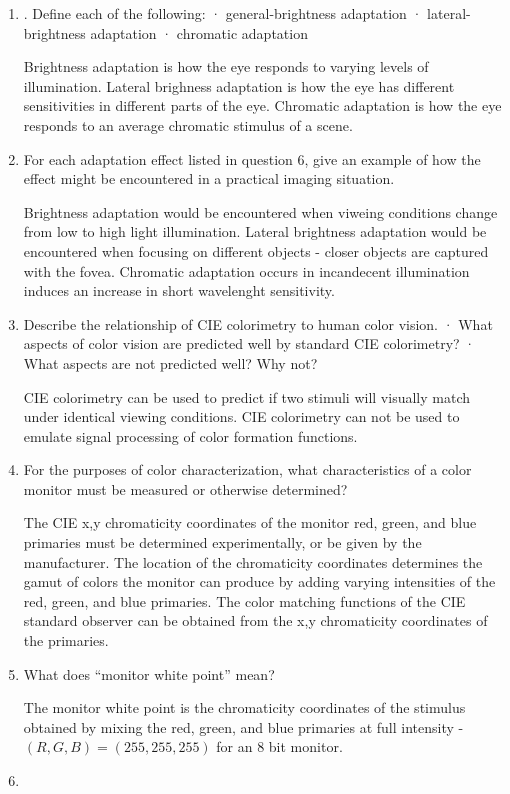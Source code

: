 \begin{enumerate}
 \item
. Define each of the following: · general-brightness adaptation · lateral-brightness adaptation · chromatic adaptation
 \par Brightness adaptation is how the eye responds to varying levels of illumination.  Lateral brighness adaptation is how the eye has different sensitivities in different parts of the eye. Chromatic adaptation is how the eye responds to an average chromatic stimulus of a scene.
 \item
 For each adaptation effect listed in question 6, give an example of how the effect might be encountered in a practical imaging situation.
 \par Brightness adaptation would be encountered when viweing conditions change from low to high light illumination.  Lateral brightness adaptation would be encountered when focusing on different objects - closer objects are captured with the fovea. Chromatic adaptation occurs in incandecent illumination induces an increase in short wavelenght sensitivity.
 \item
 Describe the relationship of CIE colorimetry to human color vision. · What aspects of color vision are predicted well by standard CIE colorimetry? · What aspects are not predicted well? Why not?
 \par CIE colorimetry can be used to predict if two stimuli will visually match under identical viewing conditions.  CIE colorimetry can not be used to emulate signal processing of color formation functions.
 \item
 For the purposes of color characterization, what characteristics of a color monitor must be measured or otherwise determined?
 \par The CIE x,y chromaticity coordinates of the monitor red, green, and blue primaries must be determined experimentally, or be given by the manufacturer.  The location of the chromaticity coordinates determines the gamut of colors the monitor can produce by adding varying intensities of the red, green, and blue primaries. The color matching functions of the CIE standard observer can be obtained from the x,y chromaticity coordinates of the primaries.
 \item
 What does “monitor white point” mean?
 \par The monitor white point is the chromaticity coordinates of the stimulus obtained by mixing the red, green, and blue primaries at full intensity - $ (R,G,B)=(255,255,255) $ for an 8 bit monitor.
 \item

\end{enumerate}

